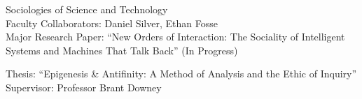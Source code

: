 
Sociologies of Science and Technology\\
Faculty Collaborators: Daniel Silver, Ethan Fosse\\
Major Research Paper: ``New Orders of Interaction: The Sociality of Intelligent Systems and Machines That Talk Back'' (In Progress)

Thesis: ``Epigenesis \& Antifinity: A Method of Analysis and the Ethic of Inquiry''\\
Supervisor: Professor Brant Downey
